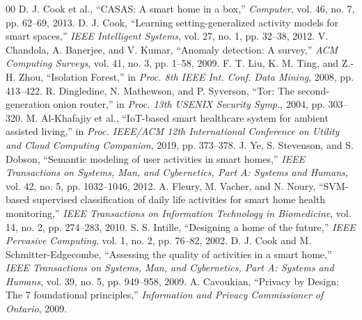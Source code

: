 \documentclass[conference]{IEEEtran}
\begin{document}
\begin{thebibliography}{00}
 D. J. Cook et al., ``CASAS: A smart home in a box,'' \textit{Computer}, vol. 46, no. 7, pp. 62--69, 2013.
 D. J. Cook, ``Learning setting-generalized activity models for smart spaces,'' \textit{IEEE Intelligent Systems}, vol. 27, no. 1, pp. 32--38, 2012.
 V. Chandola, A. Banerjee, and V. Kumar, ``Anomaly detection: A survey,'' \textit{ACM Computing Surveys}, vol. 41, no. 3, pp. 1--58, 2009.
 F. T. Liu, K. M. Ting, and Z.-H. Zhou, ``Isolation Forest,'' in \textit{Proc. 8th IEEE Int. Conf. Data Mining}, 2008, pp. 413--422.
 R. Dingledine, N. Mathewson, and P. Syverson, ``Tor: The second-generation onion router,'' in \textit{Proc. 13th USENIX Security Symp.}, 2004, pp. 303--320.
 M. Al-Khafajiy et al., ``IoT-based smart healthcare system for ambient assisted living,'' in \textit{Proc. IEEE/ACM 12th International Conference on Utility and Cloud Computing Companion}, 2019, pp. 373--378.
 J. Ye, S. Stevenson, and S. Dobson, ``Semantic modeling of user activities in smart homes,'' \textit{IEEE Transactions on Systems, Man, and Cybernetics, Part A: Systems and Humans}, vol. 42, no. 5, pp. 1032--1046, 2012.
 A. Fleury, M. Vacher, and N. Noury, ``SVM-based supervised classification of daily life activities for smart home health monitoring,'' \textit{IEEE Transactions on Information Technology in Biomedicine}, vol. 14, no. 2, pp. 274--283, 2010.
 S. S. Intille, ``Designing a home of the future,'' \textit{IEEE Pervasive Computing}, vol. 1, no. 2, pp. 76--82, 2002.
 D. J. Cook and M. Schmitter-Edgecombe, ``Assessing the quality of activities in a smart home,'' \textit{IEEE Transactions on Systems, Man, and Cybernetics, Part A: Systems and Humans}, vol. 39, no. 5, pp. 949--958, 2009.
 A. Cavoukian, ``Privacy by Design: The 7 foundational principles,'' \textit{Information and Privacy Commissioner of Ontario}, 2009.
\end{thebibliography}
\end{document}
